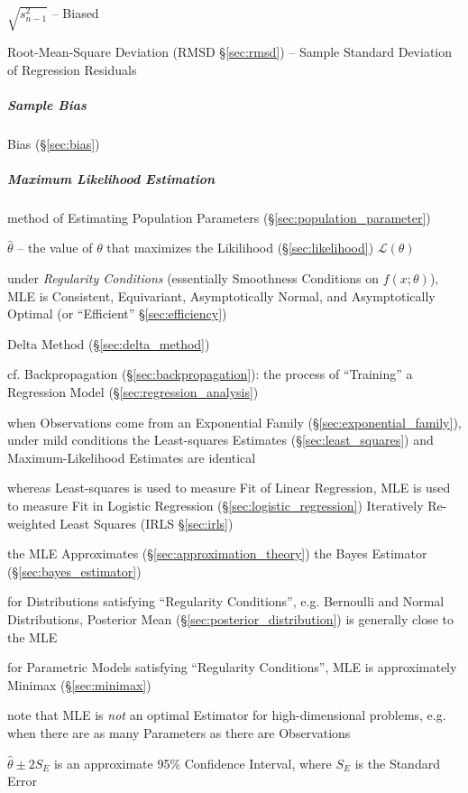 $\sqrt{s^2_{n-1}}$ -- Biased

\fist Root-Mean-Square Deviation (RMSD \S\ref{sec:rmsd}) -- Sample Standard
Deviation of Regression Residuals



\subparagraph{Sample Bias}\label{sec:sample_bias}\hfill

Bias (\S\ref{sec:bias})



\subparagraph{Maximum Likelihood Estimation}\label{sec:mle}\hfill

method of Estimating Population Parameters (\S\ref{sec:population_parameter})

$\hat{\theta}$ -- the value of $\theta$ that maximizes the Likilihood
(\S\ref{sec:likelihood}) $\mathcal{L}(\theta)$

under \emph{Regularity Conditions} (essentially Smoothness Conditions on
$f(x; \theta)$), MLE is Consistent, Equivariant, Asymptotically Normal, and
Asymptotically Optimal (or ``Efficient'' \S\ref{sec:efficiency})

\fist Delta Method (\S\ref{sec:delta_method})

cf. Backpropagation (\S\ref{sec:backpropagation}): the process of ``Training'' a
Regression Model (\S\ref{sec:regression_analysis})

when Observations come from an Exponential Family
(\S\ref{sec:exponential_family}), under mild conditions the Least-squares
Estimates (\S\ref{sec:least_squares}) and Maximum-Likelihood Estimates are
identical

whereas Least-squares is used to measure Fit of Linear Regression, MLE is used
to measure Fit in Logistic Regression (\S\ref{sec:logistic_regression}) \fist
Iteratively Re-weighted Least Squares (IRLS \S\ref{sec:irls})

the MLE Approximates (\S\ref{sec:approximation_theory}) the Bayes Estimator
(\S\ref{sec:bayes_estimator})

for Distributions satisfying ``Regularity Conditions'', e.g. Bernoulli and
Normal Distributions, Posterior Mean (\S\ref{sec:posterior_distribution}) is
generally close to the MLE

for Parametric Models satisfying ``Regularity Conditions'', MLE is approximately
Minimax (\S\ref{sec:minimax})

note that MLE is \emph{not} an optimal Estimator for high-dimensional problems,
e.g. when there are as many Parameters as there are Observations

$\hat{\theta} \pm 2\hat{S_E}$ is an approximate 95\% Confidence Interval, where
$S_E$ is the Standard Error

